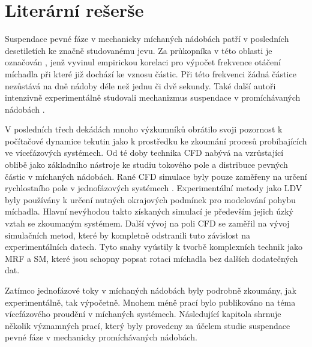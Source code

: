 \chapter{Literární rešerše}
Suspendace pevné fáze v mechanicky míchaných nádobách patří v posledních desetiletích ke značně studovanému jevu. Za průkopníka v této oblasti je označován \citet{zwi58}, jenž vyvinul empirickou korelaci pro výpočet frekvence otáčení míchadla při které již dochází ke vznosu částic. Při této frekvenci žádná částice nezůstává na dně nádoby déle než jednu či dvě sekundy. Také další autoři intenzivně experimentálně studovali mechanizmus suspendace v promíchávaných nádobách \citep{nie68,bal78,arm98}. 

V posledních třech dekádách mnoho výzkumníků obrátilo svoji pozornost k počítačové dynamice tekutin jako k prostředku ke zkoumání procesů probíhajících ve vícefázových systémech. Od té doby technika CFD nabývá na vzrůstající oblibě jako základního nástroje ke studiu tokového pole a distribuce pevných částic v míchaných nádobách. Rané CFD simulace byly pouze zaměřeny na určení rychlostního pole v jednofázových systémech \citep{kre91}. Experimentální metody jako LDV byly používány k určení nutných okrajových podmínek pro modelování pohybu míchadla. Hlavní nevýhodou takto získaných simulací je především jejich úzký vztah se zkoumaným systémem. Další vývoj na poli CFD se zaměřil na vývoj simulačních metod, které by kompletně odstranili tuto závislost na experimentálních datech. Tyto snahy vyústily k tvorbě komplexních technik jako MRF a SM, které jsou schopny popsat rotaci míchadla bez dalších dodatečných dat.  

Zatímco jednofázové toky v míchaných nádobách byly podrobně zkoumány, jak experimentálně, tak výpočetně. Mnohem méně prací bylo publikováno na téma vícefázového proudění v míchaných systémech. Následující kapitola shrnuje několik významných prací, který byly provedeny za účelem studie suspendace pevné fáze v mechanicky promíchávaných nádobách.
  
